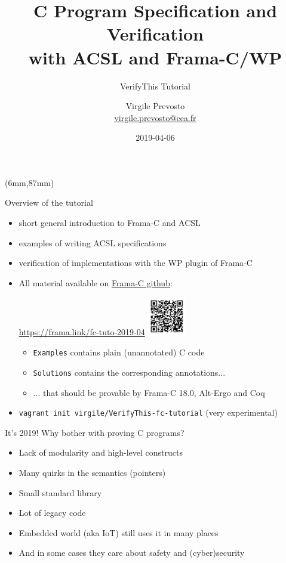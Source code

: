\documentclass[pdf,xcolor={svgnames}]{beamer}
\author{Virgile Prevosto\\
\href{mailto:virgile.prevosto@cea.fr}{virgile.prevosto@cea.fr}}
\institute{CEA Tech List}
\title{C Program Specification and Verification\\ with ACSL and Frama-C/WP}
\subtitle{VerifyThis Tutorial}
\date{2019-04-06}
\def\good{\textcolor{darkgreen}{\ding{52}}}
\def\bad{\textcolor{red}{\ding{56}}}
\begin{document}
\begin{frame}\maketitle
\begin{textblock*}{1.5cm}(6mm,87mm)
\doclicenseImage[imagewidth=8mm]
\end{textblock*}
\end{frame}

\begin{frame}{Overview of the tutorial}
\begin{itemize}
\item short general introduction to Frama-C and ACSL
\item examples of writing ACSL specifications
\item verification of implementations with the WP plugin of Frama-C
\item All material available on \href{https://github.com/Frama-C/open-source-case-studies/tree/master/tutorials/2019-04-VerifyThis}{Frama-C github}:
\begin{center}
\url{https://frama.link/fc-tuto-2019-04}\hspace{5mm}
\includegraphics[width=1.7cm,align=c]{tuto-qr.pdf}
\end{center}
\begin{itemize}
\item \alert{\texttt{Examples}} contains plain (unannotated) C code
\item \alert{\texttt{Solutions}} contains the corresponding annotations...
\item ... that should be provable by Frama-C 18.0, Alt-Ergo and Coq
\end{itemize}
\item \texttt{vagrant init virgile/VerifyThis-fc-tutorial} (very experimental)
\end{itemize}
\end{frame}

\begin{frame}{It's 2019! Why bother with proving C programs?}
\begin{itemize}
\item[\bad] Lack of modularity and high-level constructs
\item[\bad] Many quirks in the semantics (pointers)
\item[\bad] Small standard library
\item[\good] Lot of legacy code
\item[\good] Embedded world (aka IoT) still uses it in many places
\item[\good] And in some cases they care about safety and (cyber)security
\end{itemize}
\end{frame}
\end{document}
